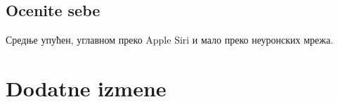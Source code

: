 \documentclass[a4paper]{report}
\begin{document}
\section{Ocenite sebe}
Средње упућен, углавном преко Apple Siri и мало преко неуронских мрежа.

\chapter{Dodatne izmene}
\end{document}
